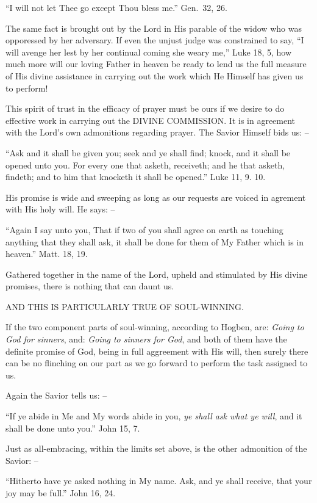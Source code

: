 \documentclass[
]{book}
\begin{document}
``I will not let Thee go except Thou bless me.'' Gen.~32, 26.

The same fact is brought out by the Lord in His parable of the widow who was opporessed by her adversary. If even the unjust judge was constrained to say, ``I will avenge her lest by her continual coming she weary me,'' Luke 18, 5, how much more will our loving Father in heaven be ready to lend us the full measure of His divine assistance in carrying out the work which He Himself has given us to perform!

This spirit of trust in the efficacy of prayer must be ours if we desire to do effective work in carrying out the DIVINE COMMISSION. It is in agreement with the Lord's own admonitions regarding prayer. The Savior Himself bids us: --

``Ask and it shall be given you; seek and ye shall find; knock, and it shall be opened unto you. For every one that asketh, receiveth; and he that asketh, findeth; and to him that knocketh it shall be opened.'' Luke 11, 9. 10.

His promise is wide and sweeping as long as our requests are voiced in agrement with His holy will. He says: --

``Again I say unto you, That if two of you shall agree on earth as touching anything that they shall ask, it shall be done for them of My Father which is in heaven.'' Matt. 18, 19.

Gathered together in the name of the Lord, upheld and stimulated by His divine promises, there is nothing that can daunt us.

AND THIS IS PARTICULARLY TRUE OF SOUL-WINNING.

If the two component parts of soul-winning, according to Hogben, are: \emph{Going to God for sinners}, and: \emph{Going to sinners for God}, and both of them have the definite promise of God, being in full aggreement with His will, then surely there can be no flinching on our part as we go forward to perform the task assigned to us.

Again the Savior tells us: --

``If ye abide in Me and My words abide in you, \emph{ye shall ask what ye will}, and it shall be done unto you.'' John 15, 7.

Just as all-embracing, within the limits set above, is the other admonition of the Savior: --

``Hitherto have ye asked nothing in My name. Ask, and ye shall receive, that your joy may be full.'' John 16, 24.
\end{document}
